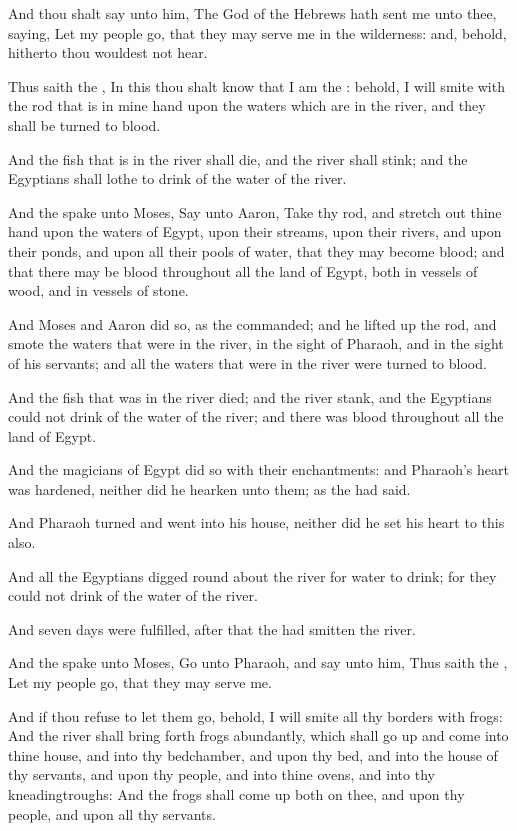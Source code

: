 \Verse And thou shalt say unto him, The \LORD God of the Hebrews hath sent me unto thee, saying, Let my people go, that they may serve me in the wilderness: and, behold, hitherto thou wouldest not hear.

\Verse Thus saith the \LORD, In this thou shalt know that I am the \LORD: behold, I will smite with the rod that is in mine hand upon the waters which are in the river, and they shall be turned to blood.

\Verse And the fish that is in the river shall die, and the river shall stink; and the Egyptians shall lothe to drink of the water of the river.

\Verse And the \LORD spake unto Moses, Say unto Aaron, Take thy rod, and stretch out thine hand upon the waters of Egypt, upon their streams, upon their rivers, and upon their ponds, and upon all their pools of water, that they may become blood; and that there may be blood throughout all the land of Egypt, both in vessels of wood, and in vessels of stone.

\Verse And Moses and Aaron did so, as the \LORD commanded; and he lifted up the rod, and smote the waters that were in the river, in the sight of Pharaoh, and in the sight of his servants; and all the waters that were in the river were turned to blood.

\Verse And the fish that was in the river died; and the river stank, and the Egyptians could not drink of the water of the river; and there was blood throughout all the land of Egypt.

\Verse And the magicians of Egypt did so with their enchantments: and Pharaoh's heart was hardened, neither did he hearken unto them; as the \LORD had said.

\Verse And Pharaoh turned and went into his house, neither did he set his heart to this also.

\Verse And all the Egyptians digged round about the river for water to drink; for they could not drink of the water of the river.

\Verse And seven days were fulfilled, after that the \LORD had smitten the river.

\Chapter
\Verse And the \LORD spake unto Moses, Go unto Pharaoh, and say unto him, Thus saith the \LORD, Let my people go, that they may serve me.

\Verse And if thou refuse to let them go, behold, I will smite all thy borders with frogs: \Verse And the river shall bring forth frogs abundantly, which shall go up and come into thine house, and into thy bedchamber, and upon thy bed, and into the house of thy servants, and upon thy people, and into thine ovens, and into thy kneadingtroughs: \Verse And the frogs shall come up both on thee, and upon thy people, and upon all thy servants.

